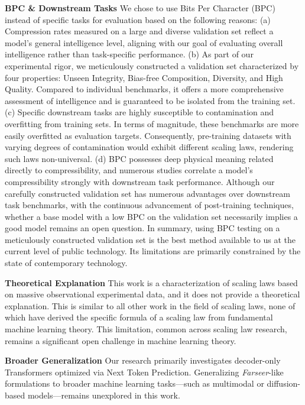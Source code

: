 \documentclass{article}
\begin{document}
\textbf{BPC \& Downstream Tasks}
    We chose to use Bits Per Character (BPC) instead of specific tasks for evaluation based on the following reasons:
    (a) Compression rates measured on a large and diverse validation set reflect a model’s general intelligence level, aligning with our goal of evaluating overall intelligence rather than task-specific performance.
    (b) As part of our experimental rigor, we meticulously constructed a validation set characterized by four properties: Unseen Integrity, Bias-free Composition, Diversity, and High Quality. Compared to individual benchmarks, it offers a more comprehensive assessment of intelligence and is guaranteed to be isolated from the training set.
    (c) Specific downstream tasks are highly susceptible to contamination and overfitting from training sets.  In terms of magnitude, these benchmarks are more easily overfitted as evaluation targets. Consequently, pre-training datasets with varying degrees of contamination would exhibit different scaling laws, rendering such laws non-universal.
    (d) BPC possesses deep physical meaning related directly to compressibility, and numerous studies correlate a model’s compressibility strongly with downstream task performance.
    Although our carefully constructed validation set has numerous advantages over downstream task benchmarks, with the continuous advancement of post-training techniques, whether a base model with a low BPC on the validation set necessarily implies a good model remains an open question.
    In summary, using BPC testing on a meticulously constructed validation set is the best method available to us at the current level of public technology. Its limitations are primarily constrained by the state of contemporary technology.

\textbf{Theoretical Explanation}
    This work is a characterization of scaling laws based on massive observational experimental data, and it does not provide a theoretical explanation. This is similar to all other work in the field of scaling laws, none of which have derived the specific formula of a scaling law from fundamental machine learning theory. 
    This limitation, common across scaling law research, remains a significant open challenge in machine learning theory.

\textbf{Broader Generalization}
Our research primarily investigates decoder-only Transformers optimized via Next Token Prediction. Generalizing \textit{Farseer}-like formulations to broader machine learning tasks—such as multimodal or diffusion-based models—remains unexplored in this work.
\end{document}
